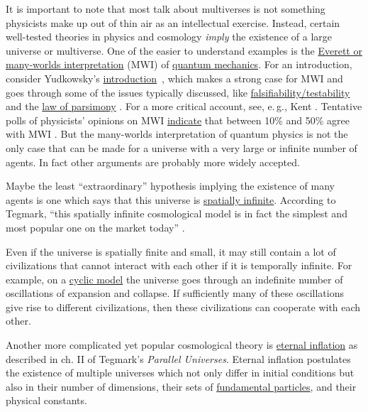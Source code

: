 It is important to note that most talk about multiverses is not
something physicists make up out of thin air as an intellectual
exercise. Instead, certain well-tested theories in physics and cosmology
\emph{imply} the existence of a large universe or multiverse. One of the
easier to understand examples is the
\href{https://en.wikipedia.org/wiki/Many-worlds_interpretation}{Everett
or many-worlds interpretation} (MWI) of
\href{https://en.wikipedia.org/wiki/Quantum_mechanics}{quantum
mechanics}. For an introduction, consider Yudkowsky's
\href{https://wiki.lesswrong.com/wiki/The_Quantum_Physics_Sequence}{introduction}~\citeyear{Yudkowsky2015-tz},
which makes a strong case for MWI and goes through some of the issues typically discussed, like
\href{http://lesswrong.com/lw/q4/decoherence_is_falsifiable_and_testable/}{falsifiability/testability}
and the
\href{http://lesswrong.com/lw/pb/belief_in_the_implied_invisible/}{law
of parsimony}
\parencite{Tegmark2001-lm,Tegmark2007-mx,Vaidman2016-cv}.
For a more critical account, see, e.\,g., Kent
\citeyear{Kent1997-lm}. Tentative polls of physicists'
opinions on MWI
\href{https://en.wikipedia.org/wiki/Many-worlds_interpretation\#Polls}{indicate}
that between 10\% and 50\% agree with MWI
\parencite{Tipler1994-di,Tegmark1997-dd,Nielsen2004-lu,Emerson2006-go}.
But the many-worlds interpretation of quantum physics is not the only
case that can be made for a universe with a very large or infinite
number of agents. In fact other arguments are probably more widely
accepted.

Maybe the least ``extraordinary'' hypothesis implying the existence of
many agents is one which says that this universe is
\href{https://en.wikipedia.org/wiki/Shape_of_the_universe}{spatially
infinite}. According to Tegmark, ``this spatially infinite
cosmological model is in fact the simplest and most popular one on the
market today'' \citeyear{Tegmark2003-sl}.

Even if the universe is spatially finite and small, it may still contain
a lot of civilizations that cannot interact with each other if it is
temporally infinite. For example, on a
\href{https://en.wikipedia.org/wiki/Cyclic_model}{cyclic model}
the universe goes through an indefinite number of oscillations of
expansion and collapse. If sufficiently many of these oscillations give
rise to different civilizations, then these civilizations can cooperate
with each other.

Another more complicated yet popular cosmological theory is
\href{https://en.wikipedia.org/wiki/Eternal_inflation}{eternal
inflation} as described in ch. II of Tegmark's \emph{Parallel
Universes}. Eternal inflation postulates the existence of multiple
universes which not only differ in initial conditions but also in their
number of dimensions, their sets of
\href{https://en.wikipedia.org/wiki/Elementary_particle}{fundamental
particles}, and their physical constants.

